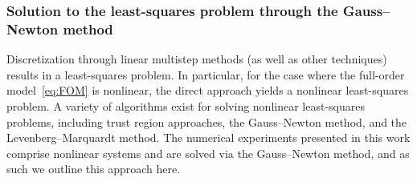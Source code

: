 \subsubsection{Solution to the least-squares problem through the Gauss--Newton method}
Discretization through linear multistep methods (as well as other techniques) 
results in a least-squares problem. In particular, for the case where the full-order model~\eqref{eq:FOM} is nonlinear, the direct approach yields a nonlinear least-squares problem. 
A variety of algorithms exist for solving nonlinear least-squares problems, including trust region approaches, the Gauss–Newton method, and the Levenberg–Marquardt method. The numerical experiments presented in this work comprise nonlinear systems and are solved via the Gauss--Newton method, and as such we outline this approach here. 

